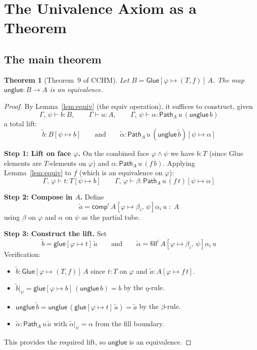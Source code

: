 \documentclass[11pt, a4paper]{article}
\newtheorem{theorem}{Theorem}[section]
\newcommand{\pt}[1]{\mathsf{#1}}
\newcommand{\GlueT}{\pt{Glue}}
\newcommand{\glueT}{\pt{glue}}
\newcommand{\unglueT}{\pt{unglue}}
\newcommand{\compT}{\pt{comp}}
\newcommand{\fillT}{\pt{fill}}
\newcommand{\PathT}{\pt{Path}}
\newcommand{\sys}[2]{[#1 \mapsto #2]}
\begin{document}
\section{The Univalence Axiom as a Theorem}

\subsection{The main theorem}

\begin{theorem}[Theorem~9 of CCHM]\label{thm:unglue-equiv}
  Let $B = \GlueT\sys{\varphi}{(T,f)}\,A$.  The map
  $\unglueT : B \to A$
  is an equivalence.
\end{theorem}

\begin{proof}
  By Lemma~\ref{lem:equiv} (the equiv operation), it suffices to construct,
  given
  \[
    \Gamma,\,\psi \vdash b : B, \qquad
    \Gamma \vdash u : A, \qquad
    \Gamma,\,\psi \vdash \alpha : \PathT_A\, u\, (\unglueT\, b)
  \]
  a total lift:
  \[
    \tilde{b} : B\sys{\psi}{b}
    \qquad\text{and}\qquad
    \tilde{\alpha} : \PathT_A\, u\, (\unglueT\,\tilde{b})\sys{\psi}{\alpha}
  \]

  \medskip\noindent\textbf{Step 1: Lift on face $\varphi$.}
  On the combined face $\varphi \wedge \psi$ we have $b : T$ (since Glue
  elements are $T$-elements on $\varphi$) and
  $\alpha : \PathT_A\, u\, (f\,b)$.
  Applying Lemma~\ref{lem:equiv} to $f$ (which is an equivalence on
  $\varphi$):
  \[
    \Gamma,\,\varphi \vdash t : T\sys{\psi}{b}
    \qquad
    \Gamma,\,\varphi \vdash \beta : \PathT_A\, u\, (f\,t)\sys{\psi}{\alpha}
  \]

  \medskip\noindent\textbf{Step 2: Compose in $A$.}
  Define
  \[
    \tilde{a} = \compT^i\, A\sys{\varphi}{\beta_i,\,\psi}{\alpha_i}\, u \;:\; A
  \]
  using $\beta$ on $\varphi$ and $\alpha$ on $\psi$ as the partial tube.

  \medskip\noindent\textbf{Step 3: Construct the lift.}
  Set
  \[
    \tilde{b} = \glueT\sys{\varphi}{t}\,\tilde{a}
    \qquad\text{and}\qquad
    \tilde{\alpha} = \fillT^i\, A\sys{\varphi}{\beta_i,\,\psi}{\alpha_i}\, u
  \]
  Verification:
  \begin{itemize}
    \item $\tilde{b} : \GlueT\sys{\varphi}{(T,f)}\,A$ since $t : T$ on
          $\varphi$ and $\tilde{a} : A\sys{\varphi}{f\,t}$. \checkmark
    \item $\tilde{b}\big|_\psi = \glueT\sys{\varphi}{b}\,(\unglueT\,b) = b$
          by the $\eta$-rule. \checkmark
    \item $\unglueT\,\tilde{b} = \unglueT\,(\glueT\sys{\varphi}{t}\,\tilde{a})
          = \tilde{a}$ by the $\beta$-rule. \checkmark
    \item $\tilde{\alpha} : \PathT_A\, u\, \tilde{a}$ with
          $\tilde{\alpha}\big|_\psi = \alpha$ from the fill boundary. \checkmark
  \end{itemize}
  This provides the required lift, so $\unglueT$ is an equivalence.
\end{proof}
\end{document}
